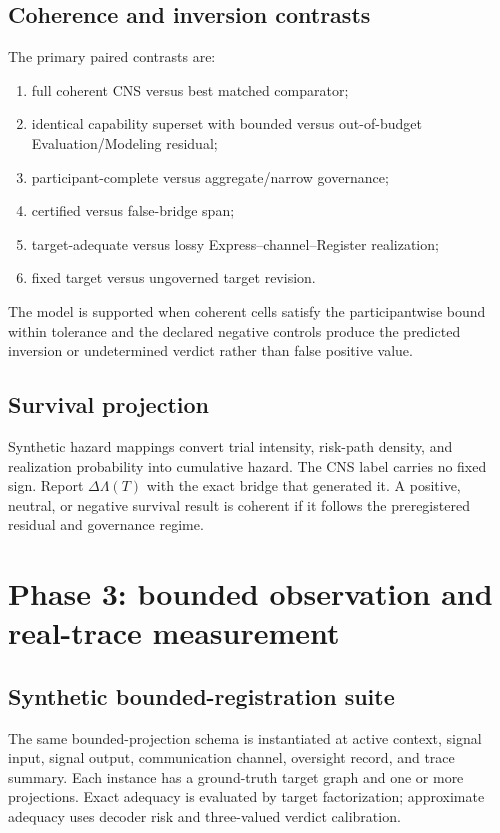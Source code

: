 \documentclass[11pt]{article}
\begin{document}
\subsection{Coherence and inversion contrasts}

The primary paired contrasts are:
\begin{enumerate}
\item full coherent CNS versus best matched comparator;
\item identical capability superset with bounded versus out-of-budget Evaluation/Modeling residual;
\item participant-complete versus aggregate/narrow governance;
\item certified versus false-bridge span;
\item target-adequate versus lossy Express--channel--Register realization;
\item fixed target versus ungoverned target revision.
\end{enumerate}
The model is supported when coherent cells satisfy the participantwise bound within tolerance and the declared negative controls produce the predicted inversion or undetermined verdict rather than false positive value.

\subsection{Survival projection}

Synthetic hazard mappings convert trial intensity, risk-path density, and realization probability into cumulative hazard. The CNS label carries no fixed sign. Report $\Delta\Lambda(T)$ with the exact bridge that generated it. A positive, neutral, or negative survival result is coherent if it follows the preregistered residual and governance regime.

\section{Phase 3: bounded observation and real-trace measurement}

\subsection{Synthetic bounded-registration suite}

The same bounded-projection schema is instantiated at active context, signal input, signal output, communication channel, oversight record, and trace summary. Each instance has a ground-truth target graph and one or more projections. Exact adequacy is evaluated by target factorization; approximate adequacy uses decoder risk and three-valued verdict calibration.
\end{document}
